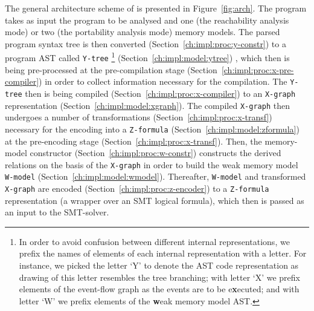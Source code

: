 The general architecture scheme of \porthos[2] is presented in Figure~\ref{fig:arch}.
The program takes as input the program to be analysed and one (the reachability analysis mode) or two (the portability analysis mode) memory models. The parsed program syntax tree is then converted (Section~\ref{ch:impl:proc:y-constr}) to a program AST called \texttt{Y-tree}%
\footnote{In order to avoid confusion between different internal representations, we prefix the names of elements of each internal representation with a letter. For instance, we picked the letter `Y' to denote the AST code representation as drawing of this letter resembles the tree branching; with letter `X' we prefix elements of the event-flow graph as the events are to be e\textbf{x}ecuted; and with letter `W' we prefix elements of the \textbf{w}eak memory model AST.} %
(Section~\ref{ch:impl:model:ytree})
, which then is being pre-processed at the pre-compilation stage (Section~\ref{ch:impl:proc:x-pre-compiler}) in order to collect information necessary for the compilation.
The \texttt{Y-tree} then is being compiled (Section~\ref{ch:impl:proc:x-compiler}) to an \texttt{X-graph} representation (Section~\ref{ch:impl:model:xgraph}).
The compiled \texttt{X-graph} then undergoes a number of transformations (Section~\ref{ch:impl:proc:x-transf}) necessary for the encoding into a \texttt{Z-formula} (Section~\ref{ch:impl:model:zformula}) at the pre-encoding stage (Section~\ref{ch:impl:proc:x-transf}).
Then, the memory-model constructor (Section~\ref{ch:impl:proc:w-constr}) constructs the derived relations on the basis of the \texttt{X-graph} in order to build the weak memory model \texttt{W-model} (Section~\ref{ch:impl:model:wmodel}).
Thereafter, \texttt{W-model} and transformed \texttt{X-graph} are encoded (Section~\ref{ch:impl:proc:z-encoder}) to a \texttt{Z-formula} representation (a wrapper over an SMT logical formula), which then is passed as an input to the SMT-solver.

